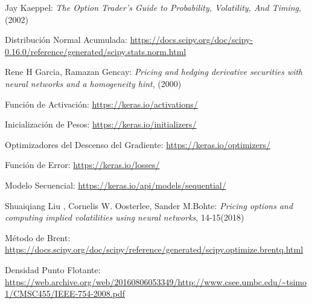 \documentclass[a4paper,openright, 12pt, oneside]{book}
\begin{document}
\begin{thebibliography}{X}
  Jay Kaeppel:
  \emph{The Option Trader’s Guide to Probability, Volatility, And Timing},
  (2002)

  Distribución Normal Acumulada:
  \url{https://docs.scipy.org/doc/scipy-0.16.0/reference/generated/scipy.stats.norm.html}

  Rene H Garcia, Ramazan Gencay:
  \emph{Pricing and hedging derivative securities with neural networks and a homogeneity hint},
  (2000)

  Función de Activación:
  \url{https://keras.io/activations/}

  Inicialización de Pesos:
  \url{https://keras.io/initializers/}

  Optimizadores del Descenso del Gradiente:
  \url{https://keras.io/optimizers/}

  Función de Error:
  \url{https://keras.io/losses/}

  Modelo Secuencial:
  \url{https://keras.io/api/models/sequential/}

  Shuaiqiang Liu , Cornelis W. Oosterlee, Sander M.Bohte:
  \emph{Pricing options and computing implied volatilities using neural networks},
  14-15(2018)

  Método de Brent:
  \url{https://docs.scipy.org/doc/scipy/reference/generated/scipy.optimize.brentq.html}

  Densidad Punto Flotante:
  \url{https://web.archive.org/web/20160806053349/http://www.csee.umbc.edu/~tsimo1/CMSC455/IEEE-754-2008.pdf}

\end{thebibliography}



%
%

\end{document}

